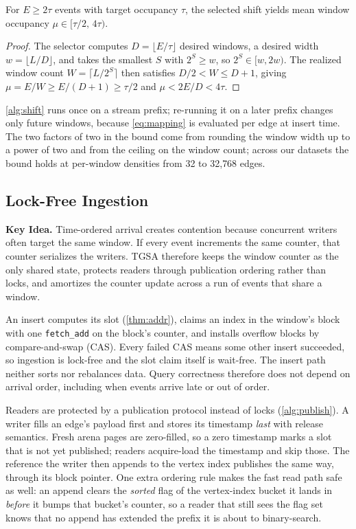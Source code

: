 \documentclass[sigconf,nonacm]{acmart}
\newcommand{\sys}{TGSA\xspace}
\begin{document}
\begin{theorem}[Granularity]
\label{thm:shift}
For $E \ge 2\tau$ events with target occupancy $\tau$, the selected
shift yields mean window occupancy $\mu \in [\tau/2,\, 4\tau)$.
\end{theorem}
\begin{proof}
The selector computes $D=\lfloor E/\tau \rfloor$ desired windows, a
desired width $w=\lfloor L/D \rfloor$, and takes the smallest $S$ with
$2^S \ge w$, so $2^S \in [w, 2w)$. The realized window count
$W=\lceil L/2^S \rceil$ then satisfies $D/2 < W \le D+1$, giving
$\mu = E/W \ge E/(D+1) \ge \tau/2$ and $\mu < 2E/D < 4\tau$.
\end{proof}

\cref{alg:shift} runs once on a stream prefix; re-running it on a
later prefix changes only future windows, because \cref{eq:mapping} is
evaluated per edge at insert time. The two factors of two in the bound
come from rounding the window width up to a power of two and from the
ceiling on the window count; across our datasets the bound holds at
per-window densities from 32 to 32{,}768 edges.

\subsection{Lock-Free Ingestion}\label{sec:storage-ingest}
\textbf{Key Idea.} Time-ordered arrival creates contention because
concurrent writers often target the same window. If every event
increments the same counter, that counter serializes the writers.
\sys therefore keeps the window counter as the only shared state,
protects readers through publication ordering rather than locks, and
amortizes the counter update across a run of events that share a
window.

An insert computes its slot (\cref{thm:addr}), claims an index in the
window's block with one \texttt{fetch\_add} on the block's counter, and
installs overflow blocks by compare-and-swap (CAS). Every failed CAS
means some other insert succeeded, so ingestion is lock-free and the
slot claim itself is wait-free. The insert path neither sorts nor rebalances data. Query correctness
therefore does not depend on arrival order, including when events
arrive late or out of order.

Readers are protected by a publication protocol instead of locks
(\cref{alg:publish}). A writer fills an edge's payload first and stores
its timestamp \emph{last} with release semantics. Fresh arena pages are
zero-filled, so a zero timestamp marks a slot that is not yet
published; readers acquire-load the timestamp and skip those. The
reference the writer then appends to the vertex index publishes the
same way, through its block pointer. One extra ordering rule makes the
fast read path safe as well: an append clears the \emph{sorted} flag
of the vertex-index bucket it lands in \emph{before} it bumps that
bucket's counter, so a reader that still sees the flag set knows that
no append has extended the prefix it is about to binary-search.
\end{document}
